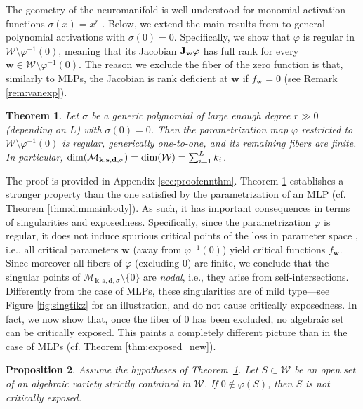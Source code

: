 \documentclass{article} %
\theoremstyle{plain}%
\newtheorem{thm}{Theorem}[section]
\newtheorem{prop}[thm]{Proposition}
\theoremstyle{definition}
\theoremstyle{remark}
\newcommand{\jacob}{\textnormal{\textbf{J}}}
\newcommand{\mfldconv}{\mathcal{M}_{\mathbf{k}, \mathbf{s}, \mathbf{d}, \sigma}}
\begin{document}
The geometry of the neuromanifold is well understood for monomial activation functions $\sigma(x)=x^r$  \citep{shahverdi2024geometryoptimizationpolynomialconvolutional, kohn2022geometry}. Below, we extend the main results from \cite{shahverdi2024geometryoptimizationpolynomialconvolutional} to  general polynomial activations with $\sigma(0)=0$. Specifically, we show that $\varphi$ is regular in $\mathcal{W} \setminus \varphi^{-1}(0)$, meaning that its Jacobian $\jacob_\mathbf{w}\varphi$ has full rank for every $\mathbf{w} \in \mathcal{W} \setminus \varphi^{-1}(0)$. The reason we exclude the fiber of the zero function is that, similarly to MLPs, the Jacobian is rank deficient at $\mathbf{w}$ if $f_\mathbf{w} = 0$ (see Remark \ref{rem:vanexp}). 
\begin{thm}
\label{thm:cnn_regular_app}
Let $\sigma$ be a generic polynomial of large enough degree $r \gg 0$ (depending on $L$) with $\sigma(0)=0$. Then the parametrization map $\varphi$ restricted to $\mathcal{W} \setminus \varphi^{-1}(0)$ is regular, generically one-to-one, and its remaining fibers are finite.  In particular, 
$\textnormal{dim}(\mfldconv) = \textnormal{dim}(\mathcal{W}) = \sum_{i=1}^L k_i$. 
\end{thm}
The proof is provided in  Appendix  \ref{sec:proofcnnthm}. Theorem \ref{thm:cnn_regular_app} establishes a stronger property than the one satisfied by the parametrization of an MLP (cf. Theorem \ref{thm:dimmainbody}). As such, it has important consequences in terms of singularities and exposedness. 
Specifically, since the parametrization $\varphi$ is regular, it does not induce spurious critical points of the loss in parameter space \citep{trager2019pure}, i.e., all critical parameters $\mathbf{w}$ (away from $\varphi^{-1}(0)$) yield critical functions $f_{\mathbf{w}}$.
Since moreover all fibers of $\varphi$ (excluding $0$) are finite, we conclude that the singular points of $\mfldconv \setminus \{ 0 \}$ are \emph{nodal}, i.e., they arise from self-intersections. Differently from the case of MLPs, these singularities are of mild type---see Figure \ref{fig:singtikz} for an illustration, and do not cause critically exposedness.
In fact, we now show that, once the fiber of $0$ has been excluded, no algebraic set can be critically exposed. This paints a completely different picture than in the case of MLPs (cf. Theorem \ref{thm:exposed_new}).
\begin{prop}\label{prop:cnnexp}
Assume the hypotheses of Theorem~\ref{thm:cnn_regular_app}.  Let $S \subset \mathcal{W}$ be an open set of an algebraic variety strictly contained in $\mathcal{W}$. If $0 \not \in \varphi(S)$, then $S$ is not critically exposed.   
\end{prop}
\end{document}
